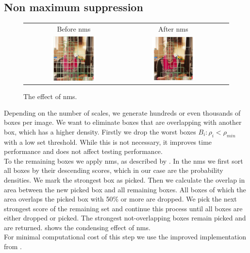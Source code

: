 \subsection{Non maximum suppression}
\label{sec:pipeline:eval:nms}
\begin{figure}[htb]
    \begin{tabular}{ccc}
        Before \gls{nms} & After \gls{nms} \\[3pt]
        \includegraphics[width=0.47\textwidth]{figures/nms_before} &
        \includegraphics[width=0.47\textwidth]{figures/nms_after}
    \end{tabular}
	\caption{The effect of \acrfull{nms}.}
    \label{fig:nms}
\end{figure}
Depending on the number of scales, we generate hundreds or even thousands of boxes per image. We want to eliminate boxes that are overlapping with another box, which has a higher density. Firstly we drop the worst boxes $B_i: \rho_i < \rho_{min}$ with a low set threshold. While this is not necessary, it improves time performance and does not affect testing performance.\\
To the remaining boxes we apply \gls{nms}, as described by \citet{felzenszwalb_discriminatively_2008}. In the \gls{nms} we first sort all boxes by their descending scores, which in our case are the probability densities. We mark the strongest box as picked. Then we calculate the overlap in area between the new picked box and all remaining boxes. All boxes of which the area overlaps the picked box with 50\% or more are dropped. We pick the next strongest score of the remaining set and continue this process until all boxes are either dropped or picked. The strongest not-overlapping boxes remain picked and are returned.  shows the condensing effect of \gls{nms}.\\For minimal computational cost of this step we use the improved implementation from \citet{malisiewicz_ensemble_2011}.
